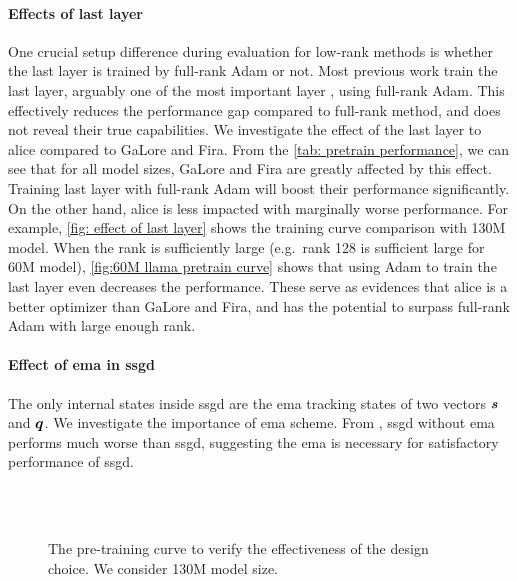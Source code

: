 \paragraph{Effects of last layer}
One crucial setup difference during evaluation for low-rank methods is whether the last layer is trained by full-rank Adam or not. Most previous work train the last layer, arguably one of the most important layer \citep{zhao2024deconstructing}, using full-rank Adam. This effectively reduces the performance gap compared to full-rank method, and does not reveal their true capabilities. We investigate the effect of the last layer to \gls{alice} compared to GaLore and Fira. From the \cref{tab: pretrain performance}, we can see that for all model sizes, GaLore and Fira are greatly affected by this effect. Training last layer with full-rank Adam will boost their performance significantly. On the other hand, \gls{alice} is less impacted with marginally worse performance. For example, \cref{fig: effect of last layer} shows the training curve comparison with 130M model. When the rank is sufficiently large (e.g.~rank 128 is sufficient large for 60M model), \cref{fig:60M llama pretrain curve} shows that using Adam to train the last layer even decreases the performance. 
These serve as evidences that \gls{alice} is a better optimizer than GaLore and Fira, and has the potential to surpass full-rank Adam with large enough rank.  

\paragraph{Effect of \gls{ema} in \gls{ssgd}}
The only internal states inside \gls{ssgd} are the \gls{ema} tracking states of two vectors ${\bm{s}}$ and ${\bm{q}}$. We investigate the importance of \gls{ema} scheme. From , \gls{ssgd} without \gls{ema} performs much worse than \gls{ssgd}, suggesting the \gls{ema} is necessary for satisfactory performance of \gls{ssgd}. 


\begin{figure}
\hfill
{}\\
\hfill
{}\\
\centering
{}
\caption{The pre-training curve to verify the effectiveness of the design choice. We consider 130M model size.}
\end{figure}

